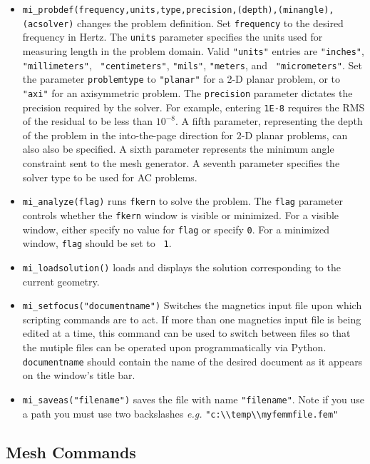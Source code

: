 \begin{itemize}
\item{\tt mi\_probdef(frequency,units,type,precision,(depth),(minangle),(acsolver)} changes the
problem definition. Set {\tt frequency} to the desired frequency in
Hertz.  The {\tt units} parameter specifies the units used for
measuring length in the problem domain.  Valid {\tt "units"}
entries are {\tt "inches"}, {\tt "millimeters"}, {\tt
"centimeters"}, {\tt "mils"}, {\tt "meters}, and {\tt
"micrometers"}. Set the parameter {\tt problemtype} to {\tt "planar"} for a 2-D
planar problem, or to {\tt "axi"} for an axisymmetric problem. The
{\tt precision} parameter dictates the precision required by the
solver.  For example, entering {\tt 1E-8} requires the RMS of the
residual to be less than $10^{-8}$.  A fifth parameter, representing the depth of
the problem in the into-the-page direction for 2-D planar problems, can also
also be specified. A sixth parameter represents the minimum angle constraint sent to the mesh generator.
A seventh parameter specifies the solver type to be used for AC problems.

\item{\tt mi\_analyze(flag)}
runs {\tt fkern} to solve the problem.  The {\tt flag} parameter
controls whether the {\tt fkern} window is visible or minimized.  For a
visible window, either specify no value for {\tt flag} or specify
{\tt 0}. For a minimized window, {\tt flag} should be set to {\tt
1}.

\item{\tt mi\_loadsolution()} loads and displays the solution corresponding to the
current geometry.

\item {\tt mi\_setfocus("documentname")} Switches the
magnetics input file upon which scripting commands are to act. If
more than one magnetics input file is being edited at a time,
this command can be used to switch between files so that the
mutiple files can be operated upon programmatically via Python. {\tt
documentname} should contain the name of the desired document as
it appears on the window's title bar.

\item{\tt mi\_saveas("filename")} saves the file with name {\tt "filename"}.
Note if you use a path you must use two backslashes {\em e.g.}
\verb+"c:\\temp\\myfemmfile.fem"+
\end{itemize}

\subsection{Mesh Commands}

